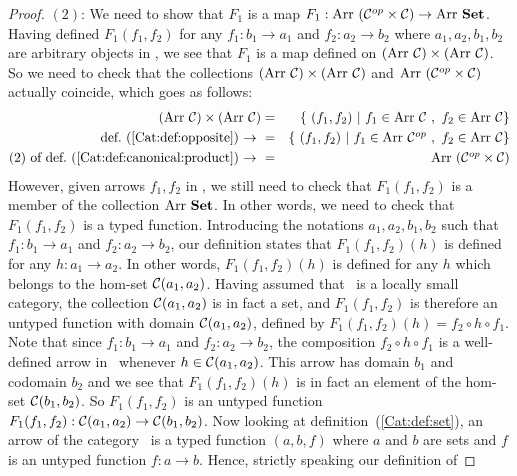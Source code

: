 \begin{proof}
    $(2)$: We need to show that $F_{1}$ is a map $F_{1}:\mbox{\rm Arr}\ (\mbox{${\cal C}^{op}$}\times\mbox{$\cal C$})
    \to\mbox{\rm Arr}\ \mbox{\bf Set}$. Having defined $F_{1}(f_{1},f_{2})$ for any $f_{1}:b_{1}\to
    a_{1}$ and $f_{2}:a_{2}\to b_{2}$ where $a_{1},a_{2},b_{1},b_{2}$ are 
    arbitrary objects in \Cat, we see that $F_{1}$ is a map defined 
    on $(\arr\ \Cat)\times(\arr\ \Cat)$. So we need to check that the collections
    $(\arr\ \Cat)\times(\arr\ \Cat)$ and $\mbox{\rm Arr}\ (\mbox{${\cal C}^{op}$}\times\mbox{$\cal C$})$ actually
    coincide, which goes as follows:
        \begin{eqnarray*}(\arr\ \Cat)\times(\arr\ \Cat)
            &=&\{\ (f_{1},f_{2})\ |\ f_{1}\in\arr\ \Cat\ ,\ f_{2}\in\arr\ \Cat\}\\
            \mbox{def.~(\ref{Cat:def:opposite})\ $\to$\ }
            &=&\{\ (f_{1},f_{2})\ |\ f_{1}\in\arr\ \Cop\ ,\ f_{2}\in\arr\ \Cat\}\\
            \mbox{$(2)$ of def.~(\ref{Cat:def:canonical:product})\ $\to$\ }
            &=&\arr\ (\Cop\times\Cat)
        \end{eqnarray*}
    However, given arrows $f_{1}, f_{2}$ in \Cat, we still need to check that
    $F_{1}(f_{1},f_{2})$ is a member of the collection $\arr\ \Set$. In other
    words, we need to check that $F_{1}(f_{1},f_{2})$ is a typed function. 
    Introducing the notations $a_{1},a_{2},b_{1},b_{2}$ such that 
    $f_{1}:b_{1}\to a_{1}$ and $f_{2}:a_{2}\to b_{2}$, our definition states 
    that $F_{1}(f_{1},f_{2})(h)$ is defined for any $h:a_{1}\to a_{2}$. In other 
    words, $F_{1}(f_{1},f_{2})(h)$ is defined for any $h$ which belongs to the 
    hom-set $\mbox{$\cal C$}(a_{1},a_{2})$. Having assumed that \Cat\ is a locally small 
    category, the collection $\mbox{$\cal C$}(a_{1},a_{2})$ is in fact a set, and 
    $F_{1}(f_{1},f_{2})$ is therefore an untyped function with domain 
    $\mbox{$\cal C$}(a_{1},a_{2})$, defined by $F_{1}(f_{1},f_{2})(h)=f_{2}\circ 
    h\circ f_{1}$. Note that since
    $f_{1}:b_{1}\to a_{1}$ and $f_{2}:a_{2}\to b_{2}$, the composition
    $f_{2}\circ h\circ f_{1}$ is a well-defined arrow in \Cat\ whenever 
    $h\in\mbox{$\cal C$}(a_{1},a_{2})$. This arrow has domain $b_{1}$ and codomain 
    $b_{2}$ and we see that $F_{1}(f_{1},f_{2})(h)$ is in fact an element
    of the hom-set $\mbox{$\cal C$}(b_{1},b_{2})$. So $F_{1}(f_{1},f_{2})$ is an 
    untyped function $F_{1}(f_{1},f_{2}):\mbox{$\cal C$}(a_{1},a_{2})\to\mbox{$\cal C$}(b_{1},b_{2})$.
    Now looking at definition~(\ref{Cat:def:set}), an arrow of the category
    \Set\ is a typed function $(a,b,f)$ where $a$ and $b$ are sets and $f$ is 
    an untyped function $f:a\to b$. Hence, strictly speaking our definition of 

\end{proof}
